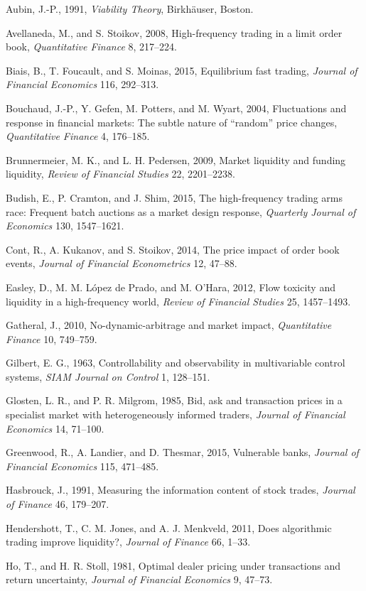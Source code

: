 \documentclass[11pt]{article}
\theoremstyle{remark}
\begin{document}
Aubin, J.-P., 1991, \emph{Viability Theory}, Birkh\"auser, Boston.

Avellaneda, M., and S. Stoikov, 2008, High-frequency trading in a limit order book, \emph{Quantitative Finance} 8, 217--224.

Biais, B., T. Foucault, and S. Moinas, 2015, Equilibrium fast trading, \emph{Journal of Financial Economics} 116, 292--313.

Bouchaud, J.-P., Y. Gefen, M. Potters, and M. Wyart, 2004, Fluctuations and response in financial markets: The subtle nature of ``random'' price changes, \emph{Quantitative Finance} 4, 176--185.

Brunnermeier, M. K., and L. H. Pedersen, 2009, Market liquidity and funding liquidity, \emph{Review of Financial Studies} 22, 2201--2238.

Budish, E., P. Cramton, and J. Shim, 2015, The high-frequency trading arms race: Frequent batch auctions as a market design response, \emph{Quarterly Journal of Economics} 130, 1547--1621.

Cont, R., A. Kukanov, and S. Stoikov, 2014, The price impact of order book events, \emph{Journal of Financial Econometrics} 12, 47--88.

Easley, D., M. M. L\'opez de Prado, and M. O'Hara, 2012, Flow toxicity and liquidity in a high-frequency world, \emph{Review of Financial Studies} 25, 1457--1493.

Gatheral, J., 2010, No-dynamic-arbitrage and market impact, \emph{Quantitative Finance} 10, 749--759.

Gilbert, E. G., 1963, Controllability and observability in multivariable control systems, \emph{SIAM Journal on Control} 1, 128--151.

Glosten, L. R., and P. R. Milgrom, 1985, Bid, ask and transaction prices in a specialist market with heterogeneously informed traders, \emph{Journal of Financial Economics} 14, 71--100.

Greenwood, R., A. Landier, and D. Thesmar, 2015, Vulnerable banks, \emph{Journal of Financial Economics} 115, 471--485.

Hasbrouck, J., 1991, Measuring the information content of stock trades, \emph{Journal of Finance} 46, 179--207.

Hendershott, T., C. M. Jones, and A. J. Menkveld, 2011, Does algorithmic trading improve liquidity?, \emph{Journal of Finance} 66, 1--33.

Ho, T., and H. R. Stoll, 1981, Optimal dealer pricing under transactions and return uncertainty, \emph{Journal of Financial Economics} 9, 47--73.
\end{document}
